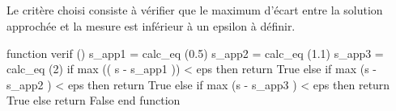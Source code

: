 \documentclass[10pt,fleqn]{article} %
\begin{document}
\subparagraph{}
Le critère choisi consiste à vérifier que le maximum d’écart entre la solution approchée et la mesure est inférieur à un epsilon à définir.

\begin{python}
function  verif ()
    s_app1 = calc_eq (0.5)
    s_app2 = calc_eq (1.1)
    s_app3 = calc_eq (2)
    if  max (( s - s_app1 )) < eps then return True
    else  if  max (s - s_app2 ) < eps then return True
    else if max (s - s_app3 ) < eps then return True
    else return False
end function
\end{python}
\end{document}
